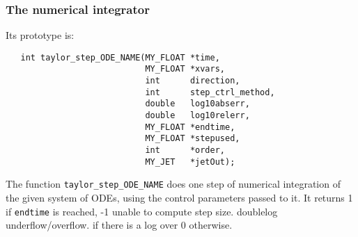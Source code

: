 \documentclass[10pt]{article}
\theoremstyle{remark}
\begin{document}
\subsubsection*{The numerical integrator}\label{sec:tnu}
Its prototype is:
\begin{verbatim}
   int taylor_step_ODE_NAME(MY_FLOAT *time,
                            MY_FLOAT *xvars,
                            int      direction,
                            int      step_ctrl_method,
                            double   log10abserr,
                            double   log10relerr,
                            MY_FLOAT *endtime,
                            MY_FLOAT *stepused,
                            int      *order,
                            MY_JET   *jetOut);
\end{verbatim}
The function \verb+taylor_step_ODE_NAME+ does one step of numerical
integration of the given system of ODEs, using the control parameters
passed to it. It returns 1 if \verb+endtime+ is reached, -1 unable to
compute step size.  doublelog underflow/overflow. if there is a log
over 0 otherwise.

\bigskip
\end{document}
